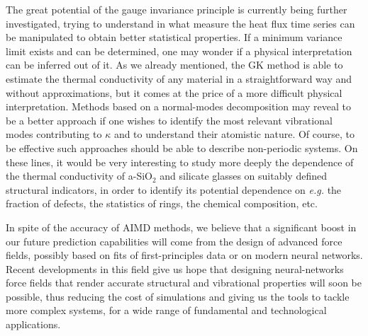 The great potential of the gauge invariance principle is currently being further investigated, trying to understand in what measure the heat flux time series can be manipulated to obtain better statistical properties. If a minimum variance limit exists and can be determined, one may wonder if a physical interpretation can be inferred out of it. 
As we already mentioned, the GK method is able to estimate the thermal conductivity of any material in a straightforward way and without approximations, but it comes at the price of a more difficult physical interpretation. 
Methods based on a normal-modes decomposition \cite{AllenFeldman1989} may reveal to be a better approach if one wishes to identify the most relevant vibrational modes contributing to $\kappa$ and to understand their atomistic nature. 
Of course, to be effective such approaches should be able to describe non-periodic systems. 
On these lines, it would be very interesting to study more deeply the dependence of the thermal conductivity of a-SiO$_2$ and silicate glasses on suitably defined structural indicators, in order to identify its potential dependence on \emph{e.g.} the fraction of defects, the statistics of rings, the chemical composition, etc.

In spite of the accuracy of AIMD methods, we believe that a significant boost in our future prediction capabilities will come from the design of advanced force fields, possibly based on fits of first-principles data or on modern neural networks. Recent developments in this field give us hope that designing neural-networks force fields that render accurate structural and vibrational properties will soon be possible, thus reducing the cost of simulations and giving us the tools to tackle more complex systems, for a wide range of fundamental and technological applications. 


    
